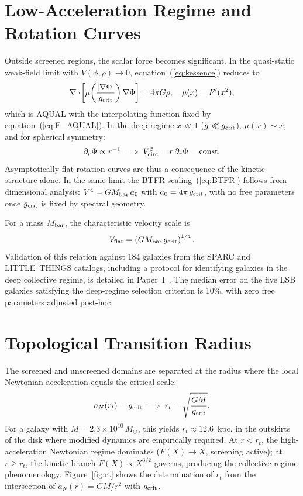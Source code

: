 \documentclass[11pt,a4paper]{article}
\begin{document}
\section{Low-Acceleration Regime and Rotation Curves}
\label{sec:lowaccel}

Outside screened regions, the scalar force becomes significant. In the quasi-static
weak-field limit with $V(\phi,\rho)\to0$, equation~(\ref{eq:kessence}) reduces to
\begin{equation}
  \nabla\cdot\!\left[\mu\!\left(\frac{|\nabla\Phi|}{g_{\rm crit}}\right)\nabla\Phi\right]
  = 4\pi G\rho,\quad\mu(x) = F'(x^2),
\end{equation}
which is AQUAL with the interpolating function fixed by equation~(\ref{eq:F_AQUAL}).
In the deep regime $x\ll 1$ ($g\ll g_{\rm crit}$), $\mu(x)\sim x$, and for spherical
symmetry:
\begin{equation}
  \partial_r\Phi \propto r^{-1}\implies V_{\rm circ}^2 = r\,\partial_r\Phi = {\rm const.}
\end{equation}
Asymptotically flat rotation curves are thus a consequence of the kinetic structure
alone. In the same limit the BTFR scaling~(\ref{eq:BTFR}) follows from dimensional
analysis: $V^4 = G M_{\rm bar}\,a_0$ with $a_0 = 4\pi\,g_{\rm crit}$, with no free parameters once
$g_{\rm crit}$ is fixed by spectral geometry.

For a mass $M_{\rm bar}$, the characteristic velocity scale is
\begin{equation}
  V_{\rm flat} = \left(G M_{\rm bar}\,g_{\rm crit}\right)^{1/4}.
\end{equation}
Validation of this relation against 184 galaxies from the SPARC \cite{Lelli2016} and
LITTLE~THINGS \cite{Hunter2012} catalogs, including a protocol for identifying galaxies
in the deep collective regime, is detailed in Paper~I~\cite{PaperI}. The median error
on the five LSB galaxies satisfying the deep-regime selection criterion is 10\%, with
zero free parameters adjusted post-hoc.

\section{Topological Transition Radius}
\label{sec:transition}

The screened and unscreened domains are separated at the radius where the local
Newtonian acceleration equals the critical scale:
\begin{equation}
  a_N(r_t) = g_{\rm crit}
  \implies
  r_t = \sqrt{\frac{GM}{g_{\rm crit}}}.
  \label{eq:rt}
\end{equation}
For a galaxy with $M = 2.3\times10^{10}\,M_\odot$, this yields
$r_t \approx 12.6$~kpc, in the outskirts of the disk where modified dynamics are
empirically required. At $r < r_t$, the high-acceleration Newtonian regime dominates
($F(X)\to X$, screening active); at $r \geq r_t$, the kinetic branch $F(X)\propto X^{3/2}$
governs, producing the collective-regime phenomenology. Figure~\ref{fig:rt} shows the
determination of $r_t$ from the intersection of $a_N(r) = GM/r^2$ with $g_{\rm crit}$.
\end{document}
